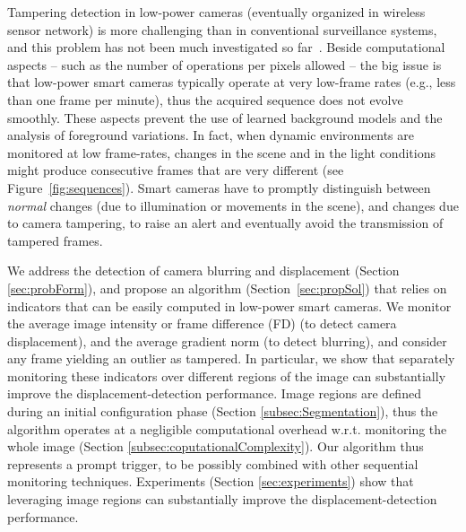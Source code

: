 \documentclass{llncs}
\begin{document}
Tampering detection in low-power cameras (eventually organized in wireless sensor network) is more challenging than in conventional surveillance systems, and this problem has not been much investigated so far~\cite{perrig2004security,alippi2010detecting}. Beside computational aspects -- such as the number of operations per pixels allowed -- the big issue is that low-power smart cameras typically operate at very low-frame rates (e.g., less than one frame per minute), thus the acquired sequence does not evolve smoothly. These aspects prevent the use of learned background models and the analysis of foreground variations. In fact, when dynamic environments are monitored at low frame-rates, changes in the scene and in the light conditions might produce consecutive frames that are very different (see Figure~\ref{fig:sequences}). Smart cameras have to promptly distinguish between \emph{normal} changes (due to illumination or movements in the scene), and changes due to camera tampering, to raise an alert and eventually avoid the transmission of tampered frames. %

We address the detection of camera blurring and displacement (Section \ref{sec:probForm}), and propose an algorithm (Section~\ref{sec:propSol}) that relies on indicators that can be easily computed in low-power smart cameras. We monitor the average image intensity or frame difference (FD) (to detect camera displacement), and the average gradient norm (to detect blurring), and consider any frame yielding an outlier as tampered. In particular, we show that separately monitoring these indicators over different regions of the image can substantially improve the displacement-detection performance. Image regions are defined during an initial configuration phase (Section \ref{subsec:Segmentation}), thus the algorithm operates at a negligible computational overhead w.r.t. monitoring the whole image (Section \ref{subsec:coputationalComplexity}). Our algorithm thus represents a prompt trigger, to be possibly combined with other sequential monitoring techniques. Experiments (Section \ref{sec:experiments}) show that leveraging image regions can substantially improve the displacement-detection performance. %
\end{document}
